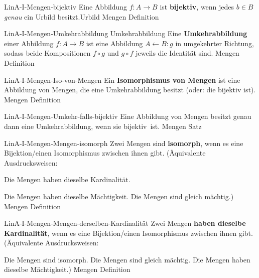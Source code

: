 \documentclass[10pt]{article}
\newcommand{\from}{\leftarrow}
\newcommand{\noloc}{:\!}
\begin{document}
\begin{note}{LinA-I-Mengen-bijektiv}
  \field
  \field
  Eine Abbildung \(f\colon A\to B\) ist \textbf{bijektiv}, wenn jedes \(b\in B\) \emph{genau} ein Urbild besitzt.\hint Urbild\clend
  \field
  \field Mengen
  \field Definition
\end{note}

\begin{note}{LinA-I-Mengen-Umkehrabbildung}
  \field Umkehrabbildung
  \field
  Eine \textbf{Umkehrabbildung} einer Abbildung \(f\colon A\to B\) ist eine Abbildung \(A\from B \noloc g\) in umgekehrter Richtung, sodass beide Kompositionen \(f\circ g \) und \(g\circ f\) jeweils die Identität sind.\clend
  \field
  \field Mengen
  \field Definition    
\end{note}

\begin{note}{LinA-I-Mengen-Iso-von-Mengen}
  \field
  \field
  Ein \textbf{Isomorphismus von Mengen} ist eine Abbildung von Mengen, die eine Umkehrabbildung besitzt (oder:  die bijektiv ist).\clend
  \field
  \field Mengen
  \field Definition    
\end{note}

\begin{note}{LinA-I-Mengen-Umkehr-falls-bijektiv}
  \field
  \field
  Eine Abbildung von Mengen besitzt genau dann eine Umkehrabbildung, wenn sie bijektiv\clend\ ist.
  \field
  \field Mengen
  \field Satz
\end{note}

\begin{note}{LinA-I-Mengen-Mengen-isomorph}
  \field
  \field
  Zwei Mengen sind \textbf{isomorph}, wenn es eine Bijektion/einen Isomorphismus zwischen ihnen gibt.\clend
  \field
  (Äquivalente Ausdrucksweisen:\par Die Mengen haben dieselbe Kardinalität.\par Die Mengen haben dieselbe Mächtigkeit.  Die Mengen sind gleich mächtig.)
  \field Mengen
  \field Definition
\end{note}

\begin{note}{LinA-I-Mengen-Mengen-derselben-Kardinalität}
  \field
  \field
  Zwei Mengen \textbf{haben dieselbe Kardinalität}, wenn es eine Bijektion/einen Isomorphismus zwischen ihnen gibt.\clend
  \field
  (Äquivalente Ausdrucksweisen:\par Die Mengen sind isomorph.  Die Mengen sind gleich mächtig.  Die Mengen haben dieselbe Mächtigkeit.)
  \field Mengen
  \field Definition
\end{note}
\end{document}
